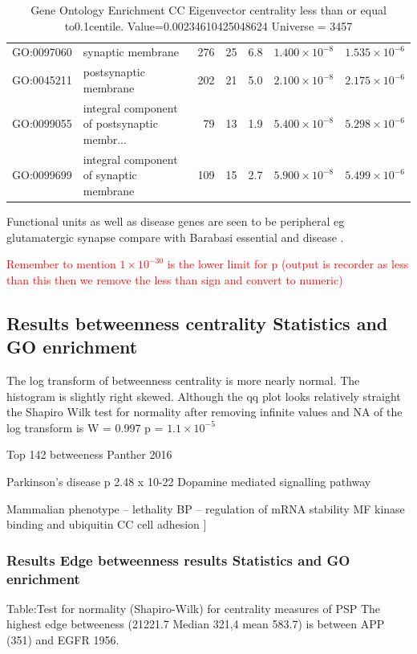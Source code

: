 \begin{table}[ht]
\begin{tabular}{llrrrrr}
  GO:0097060 & synaptic membrane & 276 & 25 & 6.8 & $1.400 \times 10^{-8}$ & $1.535 \times 10^{-6}$ \\ 
  GO:0045211 & postsynaptic membrane & 202 & 21 & 5.0 & $2.100 \times 10^{-8}$ & $2.175 \times 10^{-6}$ \\ 
  GO:0099055 & integral component of postsynaptic membr... & 79 & 13 & 1.9 & $5.400 \times 10^{-8}$ & $5.298 \times 10^{-6}$ \\ 
  GO:0099699 & integral component of synaptic membrane & 109 & 15 & 2.7 & $5.900 \times 10^{-8}$ & $5.499 \times 10^{-6}$ \\ 
   \hline
\end{tabular}
\caption{Gene Ontology Enrichment CC Eigenvector centrality  less than or equal to0.1centile.   Value=0.00234610425048624 Universe = 3457} 
\label{tab:Gene Ontology Enrichment CC Eigenvector centrality  less than or equal to0.1centile.   Value=0.00234610425048624 Universe = 3457}
\end{table}

Functional units as well as disease genes are seen to be peripheral eg glutamatergic synapse compare with Barabasi essential and disease \cite{barabasi2011network}.

\textcolor{red}{Remember to mention $1 \times 10^{-30}$ is the lower limit for p (output is recorder as less than this then we remove the less than sign and convert to numeric)}



\subsection{Results betweenness centrality Statistics and GO enrichment}
The log transform of betweenness centrality is more nearly normal. The histogram is slightly right skewed.
Although the qq plot looks relatively straight the Shapiro Wilk test for normality after removing infinite values and NA of the log transform  is 
W = 0.997 p = $1.1 \times 10^{-5}$

Top 142 betweeness
Panther 2016

Parkinson’s disease p 2.48 x 10-22
Dopamine mediated signalling pathway

Mammalian phenotype – lethality
BP – regulation of mRNA stability 
MF kinase binding and ubiquitin
CC cell adhesion
	]
\subsubsection{Results Edge betweenness results Statistics and GO enrichment}Table:Test for normality (Shapiro-Wilk) for centrality measures of PSP
The highest edge betweeness (21221.7 Median 321,4 mean 583.7) is between APP (351) and EGFR 1956.

